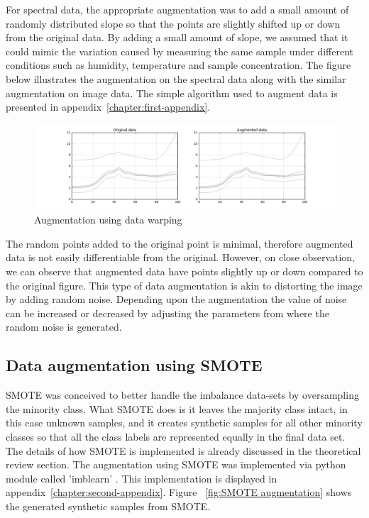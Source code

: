 For spectral data, the appropriate augmentation was to add a small amount of randomly distributed slope so that the points are slightly shifted up or down from the original data. By adding a small amount of slope, we assumed that it could mimic the variation caused by measuring the same sample under different conditions such as humidity, temperature and sample concentration. The figure below illustrates the augmentation on the spectral data along with the similar augmentation on image data. The simple algorithm used to augment data is presented in appendix~\ref{chapter:first-appendix}.

\begin{figure}[ht]
	\begin{center}
		\includegraphics[width=\textwidth]{images/simple_augment.png}
		\caption{Augmentation using data warping}
		\label{fig:simple augmentation}
	\end{center}
\end{figure}


The random points added to the original point is minimal, therefore augmented data is not easily differentiable from the original. However, on close observation, we can observe that augmented data have points slightly up or down compared to the original figure. This type of data augmentation is akin to distorting the image by adding random noise. Depending upon the augmentation the value of noise can be increased or decreased by adjusting the parameters from where the random noise is generated. 

\subsection{Data augmentation using SMOTE} 
SMOTE was conceived to better handle the imbalance data-sets by oversampling the minority class. What SMOTE does is it leaves the majority class intact, in this case unknown samples, and it creates synthetic samples for all other minority classes so that all the class labels are represented equally in the final data set. The details of how SMOTE is implemented is already discussed in the theoretical review section. The augmentation using SMOTE was implemented via python module called 'imblearn' \citep{JMLR:v18:16-365}. This implementation is displayed in appendix~\ref{chapter:second-appendix}. Figure ~\ref{fig:SMOTE augmentation} shows the generated synthetic samples from SMOTE. 


